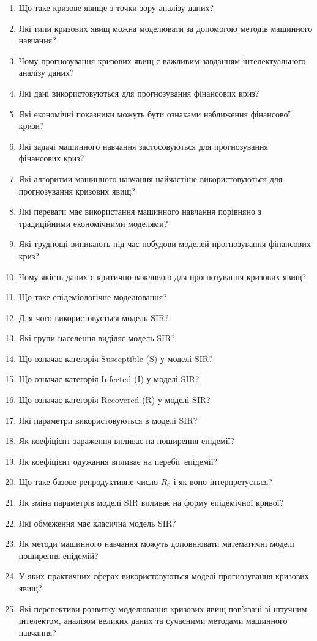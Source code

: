 \begin{enumerate}
\item Що таке кризове явище з точки зору аналізу даних?
\item Які типи кризових явищ можна моделювати за допомогою методів машинного навчання?
\item Чому прогнозування кризових явищ є важливим завданням інтелектуального аналізу даних?
\item Які дані використовуються для прогнозування фінансових криз?
\item Які економічні показники можуть бути ознаками наближення фінансової кризи?
\item Які задачі машинного навчання застосовуються для прогнозування фінансових криз?
\item Які алгоритми машинного навчання найчастіше використовуються для прогнозування кризових явищ?
\item Які переваги має використання машинного навчання порівняно з традиційними економічними моделями?
\item Які труднощі виникають під час побудови моделей прогнозування фінансових криз?
\item Чому якість даних є критично важливою для прогнозування кризових явищ?
\item Що таке епідеміологічне моделювання?
\item Для чого використовується модель SIR?
\item Які групи населення виділяє модель SIR?
\item Що означає категорія Susceptible (S) у моделі SIR?
\item Що означає категорія Infected (I) у моделі SIR?
\item Що означає категорія Recovered (R) у моделі SIR?
\item Які параметри використовуються в моделі SIR?
\item Як коефіцієнт зараження впливає на поширення епідемії?
\item Як коефіцієнт одужання впливає на перебіг епідемії?
\item Що таке базове репродуктивне число $R_{0}$ і як воно інтерпретується?
\item Як зміна параметрів моделі SIR впливає на форму епідемічної кривої?
\item Які обмеження має класична модель SIR?
\item Як методи машинного навчання можуть доповнювати математичні моделі поширення епідемій?
\item У яких практичних сферах використовуються моделі прогнозування кризових явищ?
\item Які перспективи розвитку моделювання кризових явищ пов'язані зі штучним інтелектом, аналізом великих даних та сучасними методами машинного навчання?
\end{enumerate}